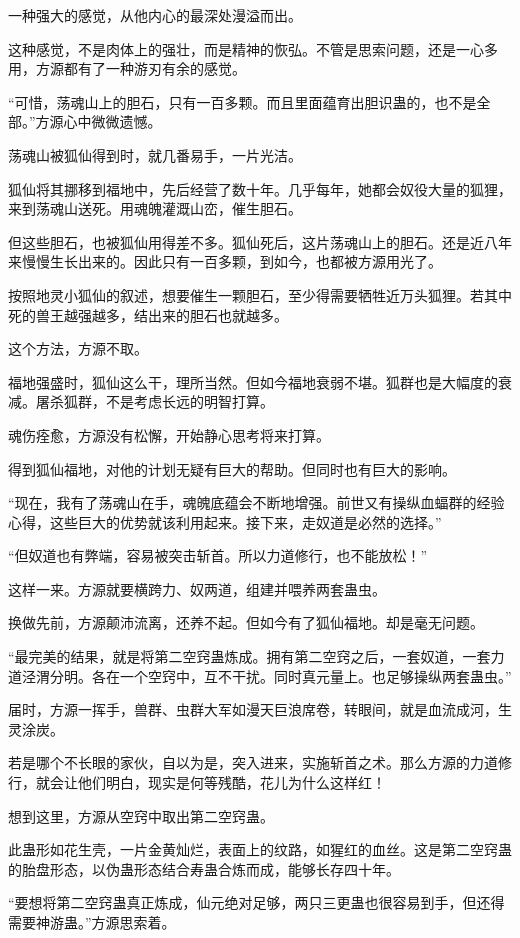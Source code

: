 \begin{this_body}
一种强大的感觉，从他内心的最深处漫溢而出。

这种感觉，不是肉体上的强壮，而是精神的恢弘。不管是思索问题，还是一心多用，方源都有了一种游刃有余的感觉。

“可惜，荡魂山上的胆石，只有一百多颗。而且里面蕴育出胆识蛊的，也不是全部。”方源心中微微遗憾。

荡魂山被狐仙得到时，就几番易手，一片光洁。

狐仙将其挪移到福地中，先后经营了数十年。几乎每年，她都会奴役大量的狐狸，来到荡魂山送死。用魂魄灌溉山峦，催生胆石。

但这些胆石，也被狐仙用得差不多。狐仙死后，这片荡魂山上的胆石。还是近八年来慢慢生长出来的。因此只有一百多颗，到如今，也都被方源用光了。

按照地灵小狐仙的叙述，想要催生一颗胆石，至少得需要牺牲近万头狐狸。若其中死的兽王越强越多，结出来的胆石也就越多。

这个方法，方源不取。

福地强盛时，狐仙这么干，理所当然。但如今福地衰弱不堪。狐群也是大幅度的衰减。屠杀狐群，不是考虑长远的明智打算。

魂伤痊愈，方源没有松懈，开始静心思考将来打算。

得到狐仙福地，对他的计划无疑有巨大的帮助。但同时也有巨大的影响。

“现在，我有了荡魂山在手，魂魄底蕴会不断地增强。前世又有操纵血蝠群的经验心得，这些巨大的优势就该利用起来。接下来，走奴道是必然的选择。”

“但奴道也有弊端，容易被突击斩首。所以力道修行，也不能放松！”

这样一来。方源就要横跨力、奴两道，组建并喂养两套蛊虫。

换做先前，方源颠沛流离，还养不起。但如今有了狐仙福地。却是毫无问题。

“最完美的结果，就是将第二空窍蛊炼成。拥有第二空窍之后，一套奴道，一套力道泾渭分明。各在一个空窍中，互不干扰。同时真元量上。也足够操纵两套蛊虫。”

届时，方源一挥手，兽群、虫群大军如漫天巨浪席卷，转眼间，就是血流成河，生灵涂炭。

若是哪个不长眼的家伙，自以为是，突入进来，实施斩首之术。那么方源的力道修行，就会让他们明白，现实是何等残酷，花儿为什么这样红！

想到这里，方源从空窍中取出第二空窍蛊。

此蛊形如花生壳，一片金黄灿烂，表面上的纹路，如猩红的血丝。这是第二空窍蛊的胎盘形态，以伪蛊形态结合寿蛊合炼而成，能够长存四十年。

“要想将第二空窍蛊真正炼成，仙元绝对足够，两只三更蛊也很容易到手，但还得需要神游蛊。”方源思索着。


\end{this_body}
